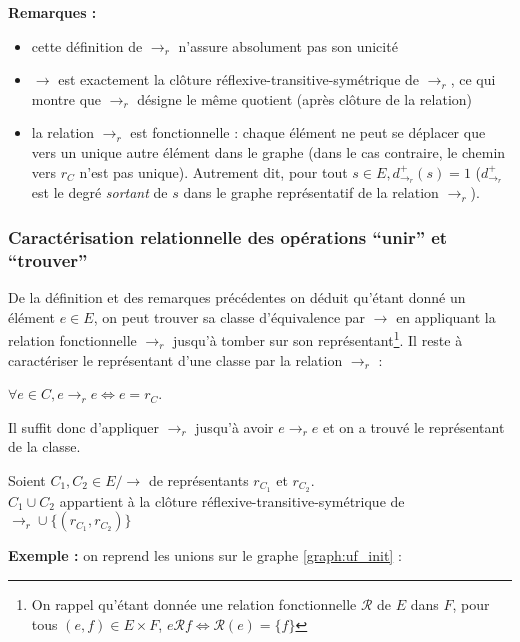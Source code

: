 \documentclass[../../../main.tex]{subfiles}
\begin{document}
\textbf{Remarques :}
\begin{itemize}
	\item cette définition de $\rightarrow_r$ n'assure absolument pas son unicité
	\item $\rightarrow$ est exactement la clôture réflexive-transitive-symétrique de $\rightarrow_r$, ce qui montre que $\rightarrow_r$ désigne le même quotient (après clôture de la relation)
	\item la relation $\rightarrow_r$ est fonctionnelle : chaque élément ne peut se déplacer que vers un unique autre élément dans le graphe (dans le cas contraire, le chemin vers $r_C$ n'est pas unique). Autrement dit, pour tout $s\in E, d_{\rightarrow_r}^{+}(s) = 1$ ($d_{\rightarrow_r}^+$ est le degré \textit{sortant} de $s$ dans le graphe représentatif de la relation $\rightarrow_r$).
\end{itemize}

\subsubsection{Caractérisation relationnelle des opérations ``unir'' et ``trouver''}
De la définition et des remarques précédentes on déduit qu'étant donné un élément $e\in E$, on peut trouver sa classe d'équivalence par $\rightarrow$ en appliquant la relation fonctionnelle $\rightarrow_r$ jusqu'à tomber sur son représentant\footnote{On rappel qu'étant donnée une relation fonctionnelle $\mathcal{R}$ de $E$ dans $F$, pour tous $(e, f)\in E\times F$, $e\mathcal{R}f \Leftrightarrow \mathcal{R}(e) = \{f\}$}. Il reste à caractériser le représentant d'une classe par la relation $\rightarrow_r$ :

 $\forall e\in C, e\rightarrow_r e\Leftrightarrow e = r_C$.

Il suffit donc d'appliquer $\rightarrow_r$ jusqu'à avoir $e\rightarrow_r e$ et on a trouvé le représentant de la classe.

 Soient $C_1, C_2\in E/\rightarrow$ de représentants $r_{C_1}$ et $r_{C_2}$. \\ 
$C_1\cup C_2$ appartient à la clôture réflexive-transitive-symétrique de $\rightarrow_r \cup \{(r_{C_1}, r_{C_2})\}$

\textbf{Exemple :} on reprend les unions sur le graphe \ref{graph:uf_init} :
\end{document}
